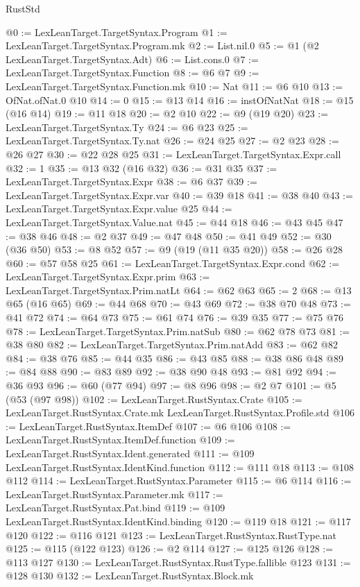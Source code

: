 \begin{lexlean}{RustStd}
\begin{coremodule}
@0 := LexLeanTarget.TargetSyntax.Program
@1 := LexLeanTarget.TargetSyntax.Program.mk
@2 := List.nil.{0}
@5 := @1 (@2 LexLeanTarget.TargetSyntax.Adt)
@6 := List.cons.{0}
@7 := LexLeanTarget.TargetSyntax.Function
@8 := @6 @7
@9 := LexLeanTarget.TargetSyntax.Function.mk
@10 := Nat
@11 := @6 @10
@13 := OfNat.ofNat.{0} @10
@14 := 0
@15 := @13 @14
@16 := instOfNatNat
@18 := @15 (@16 @14)
@19 := @11 @18
@20 := @2 @10
@22 := @9 (@19 @20)
@23 := LexLeanTarget.TargetSyntax.Ty
@24 := @6 @23
@25 := LexLeanTarget.TargetSyntax.Ty.nat
@26 := @24 @25
@27 := @2 @23
@28 := @26 @27
@30 := @22 @28 @25
@31 := LexLeanTarget.TargetSyntax.Expr.call
@32 := 1
@35 := @13 @32 (@16 @32)
@36 := @31 @35
@37 := LexLeanTarget.TargetSyntax.Expr
@38 := @6 @37
@39 := LexLeanTarget.TargetSyntax.Expr.var
@40 := @39 @18
@41 := @38 @40
@43 := LexLeanTarget.TargetSyntax.Expr.value @25
@44 := LexLeanTarget.TargetSyntax.Value.nat
@45 := @44 @18
@46 := @43 @45
@47 := @38 @46
@48 := @2 @37
@49 := @47 @48
@50 := @41 @49
@52 := @30 (@36 @50)
@53 := @8 @52
@57 := @9 (@19 (@11 @35 @20))
@58 := @26 @28
@60 := @57 @58 @25
@61 := LexLeanTarget.TargetSyntax.Expr.cond
@62 := LexLeanTarget.TargetSyntax.Expr.prim
@63 := LexLeanTarget.TargetSyntax.Prim.natLt
@64 := @62 @63
@65 := 2
@68 := @13 @65 (@16 @65)
@69 := @44 @68
@70 := @43 @69
@72 := @38 @70 @48
@73 := @41 @72
@74 := @64 @73
@75 := @61 @74
@76 := @39 @35
@77 := @75 @76
@78 := LexLeanTarget.TargetSyntax.Prim.natSub
@80 := @62 @78 @73
@81 := @38 @80
@82 := LexLeanTarget.TargetSyntax.Prim.natAdd
@83 := @62 @82
@84 := @38 @76
@85 := @44 @35
@86 := @43 @85
@88 := @38 @86 @48
@89 := @84 @88
@90 := @83 @89
@92 := @38 @90 @48
@93 := @81 @92
@94 := @36 @93
@96 := @60 (@77 @94)
@97 := @8 @96
@98 := @2 @7
@101 := @5 (@53 (@97 @98))
@102 := LexLeanTarget.RustSyntax.Crate
@105 := LexLeanTarget.RustSyntax.Crate.mk LexLeanTarget.RustSyntax.Profile.std
@106 := LexLeanTarget.RustSyntax.ItemDef
@107 := @6 @106
@108 := LexLeanTarget.RustSyntax.ItemDef.function
@109 := LexLeanTarget.RustSyntax.Ident.generated
@111 := @109 LexLeanTarget.RustSyntax.IdentKind.function
@112 := @111 @18
@113 := @108 @112
@114 := LexLeanTarget.RustSyntax.Parameter
@115 := @6 @114
@116 := LexLeanTarget.RustSyntax.Parameter.mk
@117 := LexLeanTarget.RustSyntax.Pat.bind
@119 := @109 LexLeanTarget.RustSyntax.IdentKind.binding
@120 := @119 @18
@121 := @117 @120
@122 := @116 @121
@123 := LexLeanTarget.RustSyntax.RustType.nat
@125 := @115 (@122 @123)
@126 := @2 @114
@127 := @125 @126
@128 := @113 @127
@130 := LexLeanTarget.RustSyntax.RustType.fallible @123
@131 := @128 @130
@132 := LexLeanTarget.RustSyntax.Block.mk

\end{coremodule}
\end{lexlean}
